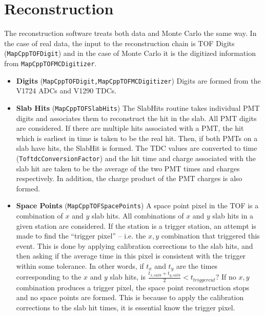 \section{Reconstruction}
The reconstruction software treats both data and Monte Carlo the same way.
In the case of real data, the input to the reconstruction chain is TOF Digits (\verb|MapCppTOFDigit|) and in the case of Monte Carlo it is the digitized information from \verb|MapCppTOFMCDigitizer|.
\begin{itemize}
\item {\bf{Digits}} (\verb|MapCppTOFDigit,MapCppTOFMCDigitizer|)
Digits are formed from the V1724 ADCs and V1290 TDCs. 
\item {\bf{Slab Hits}} (\verb|MapCppTOFSlabHits|)
The SlabHits routine takes individual PMT digits and associates them to reconstruct the hit in the slab. All PMT digits are considered. If there are multiple hits associated with a PMT, the hit which is earliest in time is taken to be the real hit. Then, if both PMTs on a slab have hits, the SlabHit is formed. The TDC values are converted to time (\verb|ToftdcConversionFactor|) and the hit time and charge associated with the slab hit are taken to be the average of the two PMT times and charges respectively. In addition, the charge product of the PMT charges is also formed.
\item {\bf{Space Points}} (\verb|MapCppTOFSpacePoints|)
A space point pixel in the TOF is a combination of $x$ and $y$ slab hits.
All combinations of $x$ and $y$ slab hits in a given station are considered.
If the station is a trigger station, an attempt is made to find the ``trigger pixel'' -- i.e. the $x,y$ combination that triggered this event. This is done by applying calibration corrections to the slab hits, and then asking if the average time in this pixel is consistent with the trigger within some tolerance. In other words, if 
$t_x$ and $t_y$ are the times corresponding to the $x$ and $y$ slab hits, 
is $\frac{t_{x,calib} + t_{y,calib}}{2} < t_{triggercut}$? If no $x,y$ combination produces a trigger pixel, the space point reconstruction stops and no space points are formed. This is because to apply the calibration corrections to the slab hit times, it is essential know the trigger pixel.


\end{itemize}
